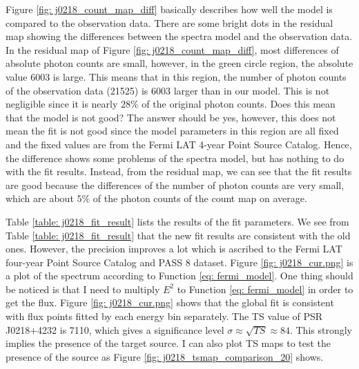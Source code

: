 \documentclass[12pt]{report}
\newcommand{\fgl}[0]{
  Fermi LAT four-year Point Source Catalog
}
\begin{document}
      Figure \ref{fig: j0218_count_map_diff} basically describes how well the model is 
      compared to the observation data. There are some bright dots in 
      the residual map showing the differences between the spectra model and the 
      observation data. In the residual map of Figure \ref{fig: j0218_count_map_diff}, 
      most differences of absolute photon counts are small, however, in the green 
      circle region, the absolute value 6003 is large. This means that in this region,
      the number of photon counts of the observation data (21525) is 6003 larger than 
      in our model. This is not negligible since it is nearly $28\%$ of the original 
      photon counts. Does this mean that the model is not good? The answer should be 
      yes, however, this does not mean the fit is not good since the model parameters 
      in this region are all fixed and the fixed values are from the Fermi LAT 4-year 
      Point Source Catalog. Hence, the difference shows some problems of the spectra 
      model, but has nothing to do with the fit results. Instead, from the residual map, 
      we can see that the fit results are good because the differences
      of the number of photon counts are very small, which are about $5\%$ of the photon 
      counts of the count map on average.

      Table \ref{table: j0218_fit_result} lists the results of the fit parameters. 
      We see from Table \ref{table: j0218_fit_result} that the new fit results are 
      consistent with the old ones. However, the precision improves a lot which is 
      ascribed to the \fgl{} and PASS 8 dataset. Figure \ref{fig: j0218_cur.png} is a 
      plot of the spectrum according to Function \ref{eq: fermi_model}.
      One thing should be noticed is that I need to multiply $E^2$ to Function 
      \ref{eq: fermi_model} 
      in order to get the flux. Figure \ref{fig: j0218_cur.png} shows that 
      the global fit is consistent with flux points fitted by each energy bin separately. 
      The TS value of PSR J0218+4232 is 7110, which gives 
      a significance level $\sigma \approx \sqrt{TS} \approx 84$. This strongly implies the 
      presence of the target source. I can also plot TS maps to test the presence of the 
      source as Figure \ref{fig: j0218_tsmap_comparison_20} shows. 
            
\end{document}
